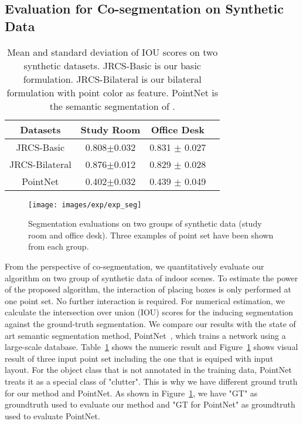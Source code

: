 \subsection{Evaluation for Co-segmentation on Synthetic Data}
\begin{table}
	\centering
	\caption{Mean and standard deviation of IOU scores on two synthetic datasets. JRCS-Basic is our basic formulation. JRCS-Bilateral  is our bilateral formulation with point color as feature. PointNet is the semantic segmentation of \cite{qi2016pointnet}. }
	\begin{tabular}{c c c c}
		Datasets &  Study Room & Office Desk \\
		\hline
		JRCS-Basic & 0.808$\pm$0.032 & 0.831 $\pm$ 0.027\\   
		JRCS-Bilateral & 0.876$\pm$0.012 & 0.829 $\pm$ 0.028\\
		PointNet & 0.402$\pm$0.032 &  0.439 $\pm$ 0.049\\
	\end{tabular}
	\label{tab:seg}
\end{table}
\begin{figure}[htb]
	\centering
	\texttt{[image: images/exp/exp\_seg]}
	\caption{\label{fig:seg} Segmentation evaluations on two groups of synthetic data (study room and office desk). Three examples of point set have been shown from each group.}
\end{figure}
%
From the perspective of co-segmentation, we quantitatively evaluate our algorithm on two group of synthetic data of indoor scenes. 
%
To estimate the power of the proposed algorithm, the interaction of placing boxes is only performed at one point set. No further interaction is required. 
%
For numerical estimation, we calculate the intersection over union (IOU) scores for the inducing segmentation against the ground-truth segmentation.
% 
We compare our results with the state of art semantic segmentation method, PointNet~\cite{qi2016pointnet}, which trains a network using a large-scale database. 
%
Table~\ref{tab:seg} shows the numeric result and Figure~\ref{fig:seg} shows visual result of three input point set including the one that is equiped with input layout.
For the object class that is not annotated in the training data, PointNet~\cite{qi2016pointnet} treats it as a special class of "clutter". This is why we have different ground truth for our method and PointNet. As shown in Figure~\ref{fig:seg}, we have "GT" as groundtruth used to evaluate our method and "GT for PointNet" as groundtruth used to evaluate PointNet. 
